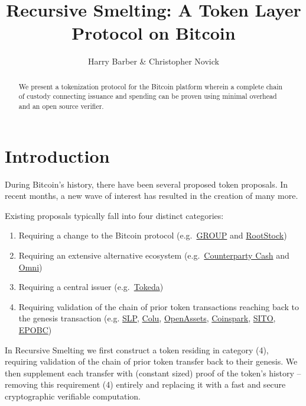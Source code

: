 \documentclass[9pt,oneside]{amsart}
\title{Recursive Smelting: A Token Layer Protocol on Bitcoin}
\author{Harry Barber \& Christopher Novick}
\begin{document}
\begin{abstract}
    We present a tokenization protocol for the Bitcoin platform wherein a complete chain of custody connecting issuance and spending can be proven using minimal overhead and an open source verifier.
\end{abstract}
\maketitle

\section{Introduction}
During Bitcoin's history, there have been several proposed token proposals. In recent months, a new wave of interest has resulted in the creation of many more. 

Existing proposals typically fall into four distinct categories: \begin{enumerate}
    \item Requiring a change to the Bitcoin protocol (e.g.\ \href{https://docs.google.com/document/d/1X-yrqBJNj6oGPku49krZqTMGNNEWnUJBRFjX7fJXvTs}{GROUP} and \href{https://en.wikipedia.org/wiki/RootStock}{RootStock})
    \item Requiring an extensive alternative ecosystem (e.g.\ \href{https://counterparty.io/docs/protocol_specification/}{Counterparty Cash} and \href{https://github.com/OmniLayer/spec}{Omni})
    \item Requiring a central issuer (e.g.\ \href{http://media.lokad.com/bitcoin/tokeda-2018-04-30.pdf}{Tokeda})
    \item Requiring validation of the chain of prior token transactions reaching back to the genesis transaction (e.g. \href{https://github.com/simpleledger/simple-ledger-protocol}{SLP}, \href{https://github.com/Colored-Coins/Colored-Coins-Protocol-Specification}{Colu}, \href{https://github.com/OpenAssets/open-assets-protocol/blob/master/specification.mediawiki}{OpenAssets}, \href{http://coinspark.org/}{Coinspark}, \href{https://github.com/awemany/sito}{SITO}, \href{https://github.com/chromaway/ngcccbase/wiki/EPOBC_simple}{EPOBC})
\end{enumerate}

In Recursive Smelting we first construct a token residing in category (4), requiring validation of the chain of prior token transfer back to their genesis. We then supplement each transfer with (constant sized) proof of the token's history -- removing this requirement (4) entirely and replacing it with a fast and secure cryptographic verifiable computation.
\end{document}
